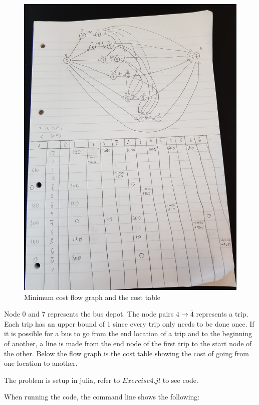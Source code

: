 \documentclass{article}
\begin{document}
\begin{figure}[H]
  \centering
  \includegraphics[width=0.9\linewidth]{pic.jpg}
  \caption{Minimum cost flow graph and the cost table}
\end{figure}

Node 0 and 7 represents the bus depot. The node pairs $4\rightarrow\overline{4}$ represents a trip. 
Each trip has an upper bound of 1 since every trip only needs to be done once.
If it is possible for a bus to go from the end location of a trip and to the beginning of another, a line is made from the end node of the first trip to the start node of the other. Below the flow graph is the cost table showing the cost of going from one location to another.

\pagebreak

The problem is setup in julia, refer to $Exercise4.jl$ to see code.

When running the code, the command line shows the following:
\end{document}
